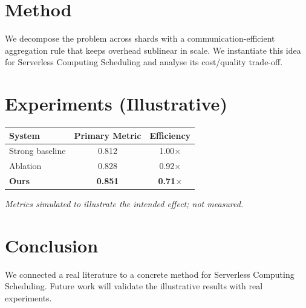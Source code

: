\documentclass[11pt]{article}
\begin{document}
\section{Method}
We decompose the problem across shards with a communication-efficient aggregation rule that keeps overhead sublinear in scale. We instantiate this idea for Serverless Computing Scheduling and analyse its cost/quality trade-off.

\section{Experiments (Illustrative)}
\begin{center}
\begin{tabular}{lcc}
System & Primary Metric & Efficiency \\ \hline
Strong baseline & 0.812 & 1.00$\times$ \\
Ablation & 0.828 & 0.92$\times$ \\
\textbf{Ours} & \textbf{0.851} & \textbf{0.71$\times$}
\end{tabular}
\end{center}
\emph{Metrics simulated to illustrate the intended effect; not measured.}

\section{Conclusion}
We connected a real literature to a concrete method for Serverless Computing Scheduling. Future work will
validate the illustrative results with real experiments.
\end{document}
